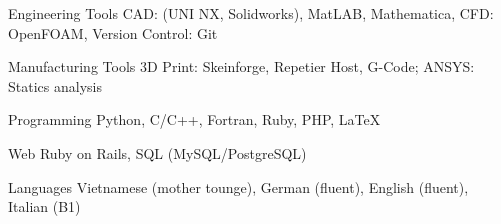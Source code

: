

\begin{cvskills}

  \cvskill
    {Engineering Tools} %
    {CAD: (UNI NX, Solidworks), MatLAB, Mathematica, CFD: OpenFOAM, Version Control: Git} %

  \cvskill
    {Manufacturing Tools} %
    {3D Print: Skeinforge, Repetier Host, G-Code; ANSYS: Statics analysis} %

  \cvskill
    {Programming} %
    {Python, C/C++, Fortran, Ruby, PHP, LaTeX} %

  \cvskill
    {Web} %
    {Ruby on Rails, SQL (MySQL/PostgreSQL)} %

  \cvskill
    {Languages} %
    {Vietnamese (mother tounge), German (fluent), English (fluent), Italian (B1)} %

\end{cvskills}
